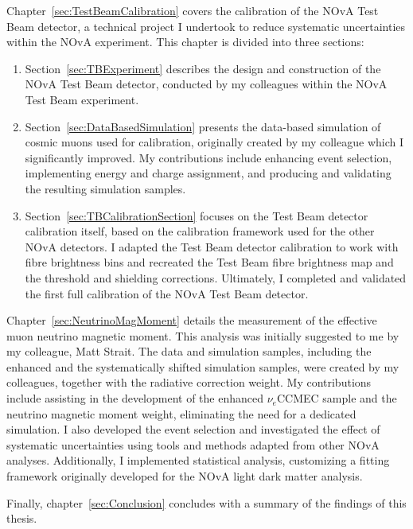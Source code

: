 Chapter~\ref{sec:TestBeamCalibration} covers the calibration of the NOvA Test Beam detector, a technical project I undertook to reduce systematic uncertainties within the NOvA experiment. This chapter is divided into three sections:
\begin{enumerate}
\item Section~\ref{sec:TBExperiment} describes the design and construction of the NOvA Test Beam detector, conducted by my colleagues within the NOvA Test Beam experiment.
\item Section~\ref{sec:DataBasedSimulation} presents the data-based simulation of cosmic muons used for calibration, originally created by my colleague which I significantly improved. My contributions include enhancing event selection, implementing energy and charge assignment, and producing and validating the resulting simulation samples.
\item Section~\ref{sec:TBCalibrationSection} focuses on the Test Beam detector calibration itself, based on the calibration framework used for the other NOvA detectors. I adapted the Test Beam detector calibration to work with fibre brightness bins and recreated the Test Beam fibre brightness map and the threshold and shielding corrections. Ultimately, I completed and validated the first full calibration of the NOvA Test Beam detector.
\end{enumerate}

Chapter~\ref{sec:NeutrinoMagMoment} details the measurement of the effective muon neutrino magnetic moment. This analysis was initially suggested to me by my colleague, Matt Strait. The data and simulation samples, including the enhanced and the systematically shifted simulation samples, were created by my colleagues, together with the radiative correction weight. My contributions include assisting in the development of the enhanced $\nu_e$CCMEC sample and the neutrino magnetic moment weight, eliminating the need for a dedicated simulation. I also developed the event selection and investigated the effect of systematic uncertainties using tools and methods adapted from other NOvA analyses. Additionally, I implemented statistical analysis, customizing a fitting framework originally developed for the NOvA light dark matter analysis.

Finally, chapter~\ref{sec:Conclusion} concludes with a summary of the findings of this thesis.

\iffalse

